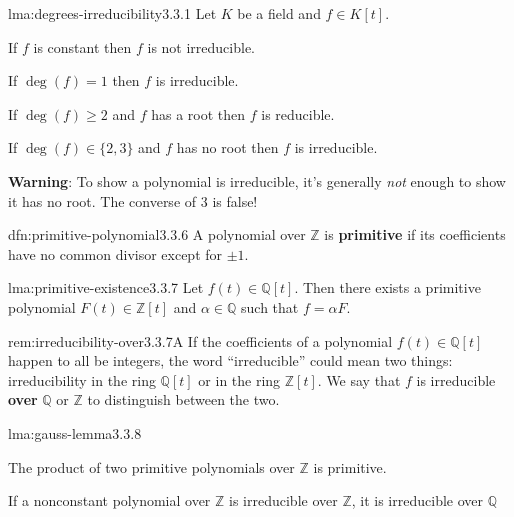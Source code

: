\documentclass[landscape, 8pt]{extarticle}
\begin{document}
\begin{multicols}{3}
\begin{lma}{lma:degrees-irreducibility}{3.3.1}
    Let $K$ be a field and $f \in K[t]$.
    \begin{enumerate-tight}
        \item If $f$ is constant then $f$ is not irreducible.
        \item If $\deg(f) = 1$ then $f$ is irreducible.
        \item If $\deg(f) \ge 2$ and $f$ has a root then $f$ is reducible.
        \item If $\deg(f)\in \{2,3\}$ and $f$ has no root then $f$ is irreducible.
    \end{enumerate-tight}

    \textbf{Warning}: To show a polynomial is irreducible, it's generally \textit{not} enough to show it has no root. The converse of $3$ is false!
\end{lma}

\begin{dfn}{dfn:primitive-polynomial}{3.3.6}
    A polynomial over $\mathbb{Z}$ is \textbf{primitive} if its coefficients have no common divisor except for $\pm 1$.
\end{dfn}

\begin{lma}{lma:primitive-existence}{3.3.7}
    Let $f(t)\in \mathbb{Q}[t]$. Then there exists a primitive polynomial $F(t)\in \mathbb{Z}[t]$ and $\alpha\in \mathbb{Q}$ such that $f = \alpha F$.
\end{lma}

\newpage

\begin{rem}{rem:irreducibility-over}{3.3.7A}
    If the coefficients of a polynomial $f(t)\in \mathbb{Q}[t]$ happen to all be integers, the word ``irreducible'' could mean two things: irreducibility in the ring $\mathbb{Q}[t]$ or in the ring $\mathbb{Z}[t]$. We say that $f$ is irreducible \textbf{over} $\mathbb{Q}$ or $\mathbb{Z}$ to distinguish between the two.
\end{rem}

\begin{lma}{lma:gauss-lemma}{3.3.8}
    \begin{enumerate-tight}
        \item The product of two primitive polynomials over $\mathbb{Z}$ is primitive.
        \item If a nonconstant polynomial over $\mathbb{Z}$ is irreducible over $\mathbb{Z}$, it is irreducible over $\mathbb{Q}$
    \end{enumerate-tight}
\end{lma}


\end{multicols}
\end{document}
